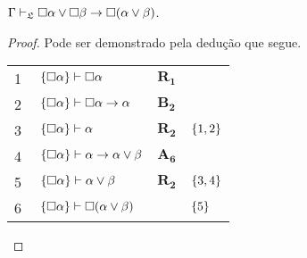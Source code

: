 \vspace{.5\baselineskip}
\begin{tcolorbox}[enhanced jigsaw, breakable, sharp corners, colframe=black, colback=white, boxrule=0.5pt, left=1.5mm, right=1.5mm, top=1.5mm, bottom=1.5mm]
    \begin{lemma}\label{necessity.disjunction.undistribution}
        $\Gamma\mathrel{\vdash}_\mathfrak{L}\Box\alpha\vee\Box\beta\to\Box(\alpha\vee\beta)$.
        \begin{proof}
        Pode ser demonstrado pela dedução que segue.

        \vspace{0.5\baselineskip}
        \footnotesize
        \setlength{\rowskip}{0.5\baselineskip}
        \begin{xltabular}{\textwidth}{r | X l l}
            \scriptsize{\phantom{0}1}\phantom{ } & $\ \set{\nec\alpha}\vdash\nec\alpha$                                                                                                   & $\hyperref[modal.rule.1]{\mathbf{R_1}}$        & \\[\rowskip]
            \scriptsize{\phantom{0}2}\phantom{ } & $\ \set{\nec\alpha}\vdash\nec\alpha\to\alpha$                                                                                          & $\hyperref[modal.axiom.modal.2]{\mathbf{B_2}}$ & \\[\rowskip]
            \scriptsize{\phantom{0}3}\phantom{ } & $\ \set{\nec\alpha}\vdash\alpha$                                                                                                       & $\hyperref[modal.rule.2]{\mathbf{R_2}}$        & $\left\{1,2\right\}$\\[\rowskip]
            \scriptsize{\phantom{0}4}\phantom{ } & $\ \set{\nec\alpha}\vdash\alpha\to\alpha\vee\beta$                                                                                     & $\hyperref[modal.axiom.6]{\mathbf{A_6}}$       & \\[\rowskip]
            \scriptsize{\phantom{0}5}\phantom{ } & $\ \set{\nec\alpha}\vdash\alpha\vee\beta$                                                                                              & $\hyperref[modal.rule.2]{\mathbf{R_2}}$        & $\left\{3,4\right\}$\\[\rowskip]
            \scriptsize{\phantom{0}6}\phantom{ } & $\ \set{\nec\alpha}\vdash\nec(\alpha\vee\beta)$                                                                                        &                       & $\left\{5\right\}$\\[\rowskip]

\end{xltabular}
\end{proof}
\end{lemma}
\end{tcolorbox}
